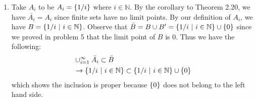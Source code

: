 \documentclass[12pt]{article}
\begin{document}
\begin{enumerate}
\item Take $A_{i}$ to be $A_{i}=\left\{1/i\right\}$ where $ i \in \mathbb{N}$. By the corollary to Theorem 2.20, we have $\bar{A_{i}}=A_{i}$ since finite sets have no limit points. By our definition of $A_{i}$, we have $B= \left\{1/i~|~i \in \mathbb{N}\right\}$. Observe that $\bar{B} = B \cup B' = \left\{1/i~|~i \in \mathbb{N}\right\} \cup \left\{0\right\}$ since we proved in problem 5 that the limit point of $B$ is 0. Thus we have the following:
\begin{align*}
& \cup^{\infty }_{i=1} \bar{A_{i}} \subset \bar{B} \\
& \rightarrow \left\{1/i~|~i \in \mathbb{N}\right\} \subset \left\{1/i~|~i \in \mathbb{N}\right\} \cup \left\{0\right\}
\end{align*}
which shows the inclusion is proper because $\left\{0\right\}$ does not belong to the left hand side.
\end{enumerate}
\end{document}

